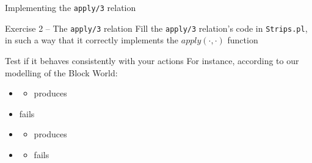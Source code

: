 \documentclass[presentation]{beamer}\mode<presentation>{\usetheme{AMSBolognaFC}}
\begin{document}
\begin{frame}[c]{Implementing the \texttt{apply/3} relation}
	\begin{block}{Exercise 2 -- The \texttt{apply/3} relation}
		Fill the \texttt{apply/3} relation's code in \texttt{Strips.pl}, in such a way that it correctly implements the $apply(\cdot, \cdot)$ function
	\end{block}

	\begin{exampleblock}{Test if it behaves consistently with your actions}
		\footnotesize
		For instance, according to our modelling of the Block World:
		\begin{itemize}
			\item {}
			\begin{itemize}
				\item produces 
			\end{itemize}

			\item {} fails

			\item {}
			\begin{itemize}
				\item produces 
			\end{itemize}

			\item {}
			\begin{itemize}
				\item fails
			\end{itemize}
		\end{itemize}
	\end{exampleblock}
\end{frame}
\end{document}

